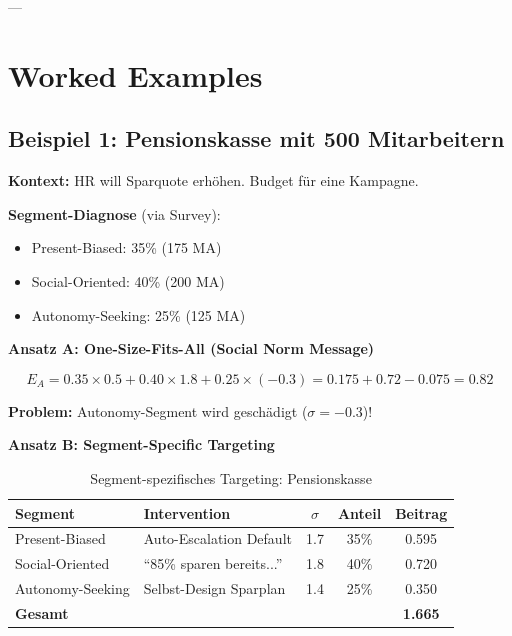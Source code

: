 ---

\section{Worked Examples}
\label{sec:19-examples}

\subsection{Beispiel 1: Pensionskasse mit 500 Mitarbeitern}

\textbf{Kontext:} HR will Sparquote erhöhen. Budget für eine Kampagne.

\textbf{Segment-Diagnose} (via Survey):
\begin{itemize}[nosep]
\item Present-Biased: 35\% (175 MA)
\item Social-Oriented: 40\% (200 MA)
\item Autonomy-Seeking: 25\% (125 MA)
\end{itemize}

\textbf{Ansatz A: One-Size-Fits-All (Social Norm Message)}

\begin{equation}
E_A = 0.35 \times 0.5 + 0.40 \times 1.8 + 0.25 \times (-0.3) = 0.175 + 0.72 - 0.075 = 0.82
\label{eq:19-example-a}
\end{equation}

\textbf{Problem:} Autonomy-Segment wird geschädigt ($\sigma = -0.3$)!

\textbf{Ansatz B: Segment-Specific Targeting}

\begin{table}[htbp]
\centering
\caption{Segment-spezifisches Targeting: Pensionskasse}
\label{tab:19-example-pension}
\renewcommand{\arraystretch}{1.3}
\small
\begin{tabular}{@{}llccc@{}}
\toprule
\textbf{Segment} & \textbf{Intervention} & \textbf{$\sigma$} & \textbf{Anteil} & \textbf{Beitrag} \\
\midrule
Present-Biased & Auto-Escalation Default & 1.7 & 35\% & 0.595 \\
Social-Oriented & ``85\% sparen bereits...'' & 1.8 & 40\% & 0.720 \\
Autonomy-Seeking & Selbst-Design Sparplan & 1.4 & 25\% & 0.350 \\
\midrule
\textbf{Gesamt} & & & & \textbf{1.665} \\
\bottomrule
\end{tabular}
\end{table}

